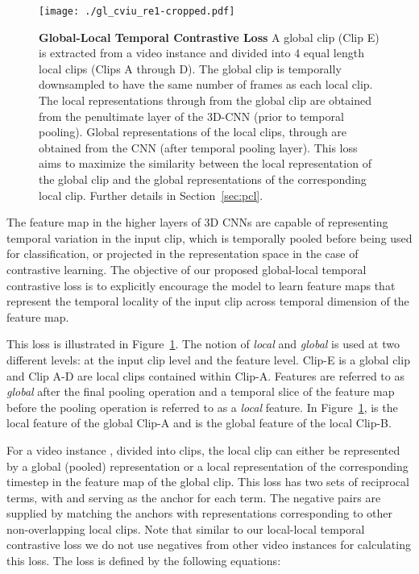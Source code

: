 \documentclass[10pt,twocolumn,letterpaper]{article}
\begin{document}
\begin{figure}[h]
\centering
  \texttt{[image: ./gl\_cviu\_re1-cropped.pdf]}
 \vspace{-3mm}
 \caption{\textbf{Global-Local Temporal Contrastive Loss} A global clip (Clip E) is extracted from a video instance and divided into 4 equal length local clips (Clips A through D). The global clip is temporally downsampled to have the same number of frames as each local clip. The local representations  through  from the global clip are obtained from the penultimate layer of the 3D-CNN (prior to temporal pooling). Global representations of the local clips,  through  are obtained from the CNN (after temporal pooling layer). This loss aims to maximize the similarity between the local representation of the global clip and the global representations of the corresponding local clip. Further details in Section~\ref{sec:pcl}.}
\label{fig:tcp}
\end{figure}



The feature map in the higher layers of 3D CNNs are capable of representing temporal variation in the input clip, which is temporally pooled before being used for classification, or projected in the representation space in the case of contrastive learning. The objective of our proposed global-local temporal contrastive loss is to explicitly encourage the model to learn feature maps that represent the temporal locality of the input clip across temporal dimension of the feature map. 


 







This loss is illustrated in Figure~\ref{fig:tcp}. The notion of \textit{local} and \textit{global} is used at two different levels: at the input clip level and the feature level. Clip-E is a global clip and Clip A-D are local clips contained within Clip-A. Features are referred to as \textit{global} after the final pooling operation and a temporal slice of the feature map before the pooling operation is referred to as a \textit{local} feature. In Figure~\ref{fig:tcp},  is the local feature of the global Clip-A and  is the global feature of the local Clip-B. 



For a video instance , divided into  clips, the local clip  can either be represented by a global (pooled) representation  or a local representation  of the corresponding timestep in the feature map of the global clip. This loss has two sets of reciprocal terms, with  and  serving as the anchor for each term. The negative pairs are supplied by matching the anchors with representations corresponding to other non-overlapping local clips. Note that similar to our local-local temporal contrastive loss we do not use negatives from other video instances for calculating this loss. The loss is defined by the following equations: 
\end{document}
